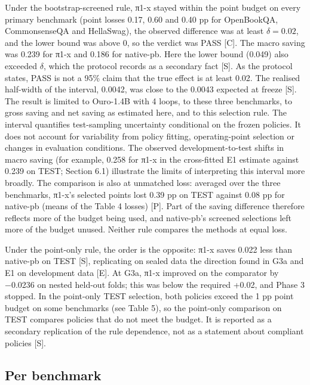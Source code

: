 Under the bootstrap-screened rule, π1-x stayed within the point budget on every primary benchmark (point losses 0.17, 0.60 and 0.40 pp for OpenBookQA, CommonsenseQA and HellaSwag), the observed difference was at least \(\delta = 0.02\), and the lower bound was above 0, so the verdict was PASS {[}C{]}. The macro saving was 0.239 for π1-x and 0.186 for native-pb. Here the lower bound (0.049) also exceeded \(\delta\), which the protocol records as a secondary fact {[}S{]}. As the protocol states, PASS is not a 95\% claim that the true effect is at least 0.02. The realised half-width of the interval, 0.0042, was close to the 0.0043 expected at freeze {[}S{]}. The result is limited to Ouro-1.4B with 4 loops, to these three benchmarks, to gross saving and net saving as estimated here, and to this selection rule. The interval quantifies test-sampling uncertainty conditional on the frozen policies. It does not account for variability from policy fitting, operating-point selection or changes in evaluation conditions. The observed development-to-test shifts in macro saving (for example, 0.258 for π1-x in the cross-fitted E1 estimate against 0.239 on TEST; Section 6.1) illustrate the limits of interpreting this interval more broadly. The comparison is also at unmatched loss: averaged over the three benchmarks, π1-x's selected points lost 0.39 pp on TEST against 0.08 pp for native-pb (means of the Table 4 losses) {[}P{]}. Part of the saving difference therefore reflects more of the budget being used, and native-pb's screened selections left more of the budget unused. Neither rule compares the methods at equal loss.

Under the point-only rule, the order is the opposite: π1-x saves 0.022 less than native-pb on TEST {[}S{]}, replicating on sealed data the direction found in G3a and E1 on development data {[}E{]}. At G3a, π1-x improved on the comparator by −0.0236 on nested held-out folds; this was below the required +0.02, and Phase 3 stopped. In the point-only TEST selection, both policies exceed the 1 pp point budget on some benchmarks (see Table 5), so the point-only comparison on TEST compares policies that do not meet the budget. It is reported as a secondary replication of the rule dependence, not as a statement about compliant policies {[}S{]}.

\subsection{Per benchmark}

